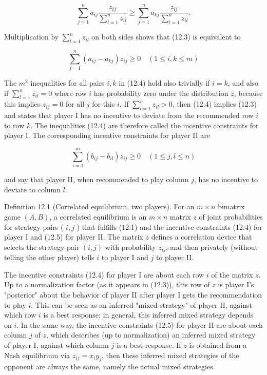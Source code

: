 \documentclass[12pt]{article}
\begin{document}
\begin{equation*}
\sum_{j=1}^{n} a_{i j} \frac{z_{i j}}{\sum_{l=1}^{n} z_{i l}} \geq \sum_{j=1}^{n} a_{k j} \frac{z_{i j}}{\sum_{l=1}^{n} z_{i l}} . \tag{12.3}
\end{equation*}


Multiplication by $\sum_{l=1}^{n} z_{i l}$ on both sides shows that (12.3) is equivalent to


\begin{equation*}
\sum_{j=1}^{n}\left(a_{i j}-a_{k j}\right) z_{i j} \geq 0 \quad(1 \leq i, k \leq m) \tag{12.4}
\end{equation*}


The $m^{2}$ inequalities for all pairs $i, k$ in (12.4) hold also trivially if $i=k$, and also if $\sum_{l=1}^{n} z_{i l}=0$ where row $i$ has probability zero under the distribution $z$, because this implies $z_{i j}=0$ for all $j$ for this $i$. If $\sum_{l=1}^{n} z_{i l}>0$, then (12.4) implies (12.3) and states that player I has no incentive to deviate from the recommended row $i$ to row $k$. The inequalities (12.4) are therefore called the incentive constraints for player I. The corresponding incentive constraints for player II are


\begin{equation*}
\sum_{i=1}^{m}\left(b_{i j}-b_{i l}\right) z_{i j} \geq 0 \quad(1 \leq j, l \leq n) \tag{12.5}
\end{equation*}


and say that player II, when recommended to play column $j$, has no incentive to deviate to column $l$.

Definition 12.1 (Correlated equilibrium, two players). For an $m \times n$ bimatrix game $(A, B)$, a correlated equilibrium is an $m \times n$ matrix $z$ of joint probabilities for strategy pairs ( $i, j$ ) that fulfills (12.1) and the incentive constraints (12.4) for player I and (12.5) for player II. The matrix $z$ defines a correlation device that selects the strategy pair $(i, j)$ with probability $z_{i j}$, and then privately (without telling the other player) tells $i$ to player I and $j$ to player II.

The incentive constraints (12.4) for player I are about each row $i$ of the matrix $z$. Up to a normalization factor (as it appears in (12.3)), this row of $z$ is player I's "posterior" about the behavior of player II after player I gets the recommendation to play $i$. This can be seen as an inferred "mixed strategy" of player II, against which row $i$ is a best response; in general, this inferred mixed strategy depends on $i$. In the same way, the incentive constraints (12.5) for player II are about each column $j$ of $z$, which describes (up to normalization) an inferred mixed strategy of player I, against which column $j$ is a best response. If $z$ is obtained from a Nash equilibrium via $z_{i j}=x_{i} y_{j}$, then these inferred mixed strategies of the opponent are always the same, namely the actual mixed strategies.
\end{document}
